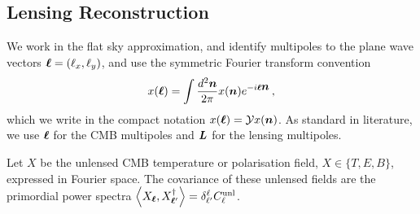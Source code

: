 \documentclass[prd, superscriptaddress, tightenlines, longbibliography, nofootinbib, eqsecnum, amsfonts, amsmath, floatfix, twocolumn, notitlepage]{revtex4-2}
\newcommand{\JC}[1]{\color{purple}{{JC:#1}}\color{black}\xspace}
\newcommand{\LL}[1]{{\color{orange}{LL: #1}}}
\begin{document}
\subsection{Lensing Reconstruction}

\LL{TODO: homogenize notations with the previous section}

We work in the flat sky approximation, and identify multipoles to the plane wave vectors ${\boldsymbol{\ell}} = (\ell_x, \ell_y)$, and use the symmetric Fourier transform convention\JC{x, really?}
\begin{equation}
    x({\boldsymbol{\ell}}) = \int \frac{d^2 {\mbox{\boldmath{$n$}}}}{2\pi} x({\mbox{\boldmath{$n$}}}) e^{-i{\boldsymbol{\ell}} {\mbox{\boldmath{$n$}}}}\, ,
\end{equation}
which we write in the compact notation $x({\boldsymbol{\ell}}) = \mathcal{Y} x({\mbox{\boldmath{$n$}}})$.
As standard in literature, we use ${\boldsymbol{\ell}}$ for the CMB multipoles and ${\mbox{\boldmath{$L$}}}$ for the lensing multipoles.   

Let $X$ be the unlensed CMB temperature or polarisation field, $X \in \{T, E, B\}$, expressed in Fourier space. 
The covariance of these unlensed fields are the primordial power spectra 
$\left<X_{{\boldsymbol{\ell}}}, X_{{\boldsymbol{\ell}}'}^\dagger \right> = \delta^{\ell}_{\ell'} C_\ell^{\rm unl}$.
\end{document}

